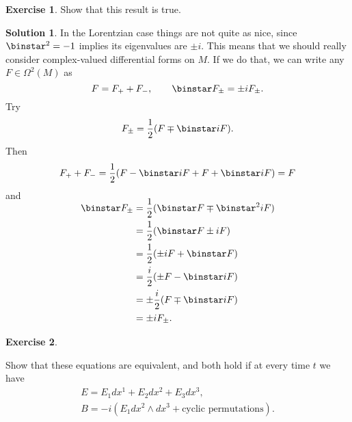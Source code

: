 \documentclass[11pt, a4paper]{report}
\theoremstyle{definition}
\newtheorem{exercise}{Exercise}[part]
\newtheorem{solution}{Solution}[part]
\newenvironment{ex}{\begin{exercise}}{\end{exercise}\pagebreak[1]}
\newenvironment{sol}{\begin{solution}}{\end{solution}\pagebreak[3]}
\newcommand*{\op}[1]{\ensuremath\mathop{}\mathopen{}#1}
\renewcommand*{\star}{\op{\binstar}\mathord{}}
\begin{document}
\begin{ex}

Show that this result is true.

\end{ex}

\begin{sol}

In the Lorentzian case things are not quite as nice, since $\star^2 = -1$ implies its eigenvalues are $\pm i$. This means that we should really consider complex-valued differential forms on $M$. If we do that, we can write any $F \in \Omega^2(M)$ as
\[
    F = F_+ + F_-, \qquad
    \star F_\pm = \pm i F_\pm.
\]
Try
\[
    F_\pm = \frac{1}{2} (F \mp \star i F).
\]
Then
\[
    F_+ + F_- = \frac{1}{2} (F - \star i F + F + \star i F) = F
\]
and
\begin{align*}
    \SwapAboveDisplaySkip
    \star F_\pm &= \frac{1}{2}(\star F \mp \star^2 i F) \\
                &= \frac{1}{2}(\star F \pm i F) \\
                &= \frac{1}{2}(\pm i F + \star F) \\
                &= \frac{i}{2}(\pm F - \star i F) \\
                &= \pm \frac{i}{2}(F \mp \star i F) \\
                &= \pm i F_\pm.
\end{align*}

\end{sol}

\begin{ex}\label{ex:ebselfdual}

Show that these equations are equivalent, and both hold if at every time $t$ we have
\begin{gather*}
    E = E_1 dx^1 + E_2 dx^2 + E_3 dx^3, \\
    B = -i (E_1 dx^2 \wedge dx^3 + \text{cyclic permutations}).
\end{gather*}

\end{ex}
\end{document}
